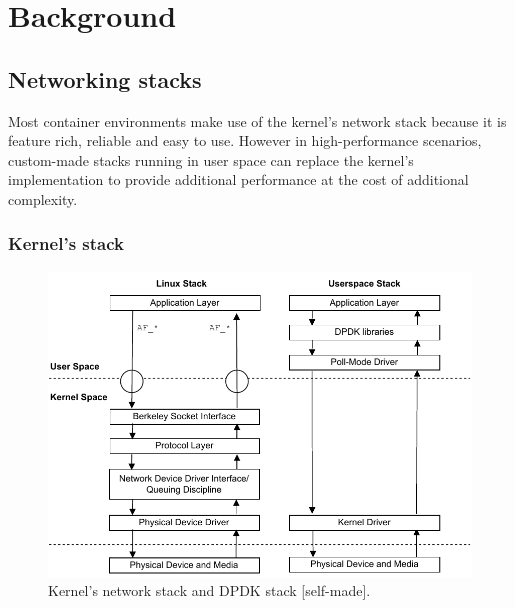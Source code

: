 \documentclass[conference]{IEEEtran}
\begin{document}
\section{Background}
\subsection{Networking stacks}
Most container environments make use of the kernel's network stack because it is feature rich, reliable and easy to use. However in high-performance scenarios, custom-made stacks running in user space can replace the kernel's implementation to provide additional performance at the cost of additional complexity.  
\subsubsection{Kernel's stack}
\begin{figure}[!t]
\centering
\includegraphics[scale=0.6]{kernel_stack.drawio.pdf}
\caption{Kernel's network stack \cite{kernel_stack} and DPDK stack [self-made].}
\label{kernel_stack}
\end{figure}
\end{document}
